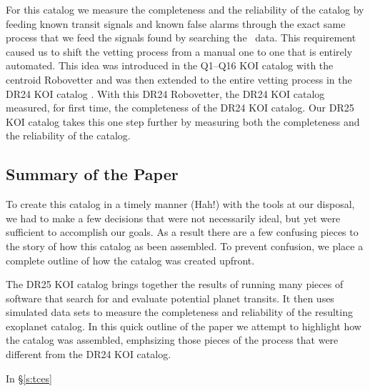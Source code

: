 For this catalog we measure the completeness and the reliability of the catalog by feeding known transit signals and known false alarms through the exact same process that we feed the signals found by searching the \Kepler\ data.  This requirement caused us to shift the vetting process from a manual one to one that is entirely automated.  This idea was introduced in the Q1--Q16 KOI catalog \citet{Mullally2016cat} with the centroid Robovetter and was then extended to the entire vetting process in the DR24 KOI catalog \citep{Coughlin2016}. With this DR24 Robovetter, the DR24 KOI catalog measured, for first time, the completeness of the DR24 KOI catalog. Our DR25 KOI catalog takes this one step further by measuring both the completeness and the reliability of the catalog.

\subsection{Summary of the Paper}
To create this catalog in a timely manner (Hah!) with the tools at our disposal, we had to make a few decisions that were not necessarily ideal, but yet were sufficient to accomplish our goals.  As a result there are a few confusing pieces to the story of how this catalog as been assembled. To prevent confusion, we place a complete outline of how the catalog was created upfront.

The DR25 KOI catalog brings together the results of running many pieces of software that search for and evaluate potential planet transits. It then uses simulated data sets to measure the completeness and reliability of the resulting exoplanet catalog.  In this quick outline of the paper we attempt to highlight how the catalog was assembled, emphsizing those pieces of the process that were different from the DR24 KOI catalog.

In \S\ref{s:tces}
